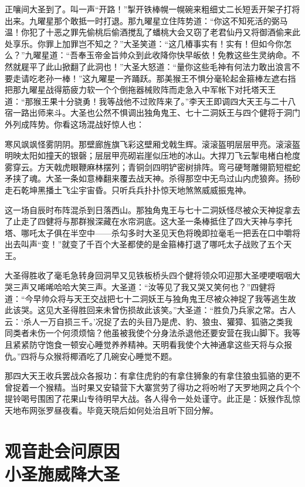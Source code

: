 \documentclass[12pt,UTF8]{ctexbook}
\begin{document}
{正嚷间大圣到了。叫一声“开路！”掣开铁棒幌一幌碗来粗细丈二长短丢开架子打将出来。九曜星那个敢抵一时打退。那九曜星立住阵势道：“你这不知死活的弼马温！你犯了十恶之罪先偷桃后偷酒搅乱了蟠桃大会又窃了老君仙丹又将御酒偷来此处享乐。你罪上加罪岂不知之？”大圣笑道：“这几椿事实有！实有！但如今你怎么？”九曜星道：“吾奉玉帝金旨帅众到此收降你快早皈依！免教这些生灵纳命。不然就屣平了此山掀翻了此洞也！”大圣大怒道：“量你这些毛神有何法力敢出浪言不要走请吃老孙一棒！”这九曜星一齐踊跃。那美猴王不惧分毫轮起金箍棒左遮右挡把那九曜星战得筋疲力软一个个倒拖器械败阵而走急入中军帐下对托塔天王道：“那猴王果十分骁勇！我等战他不过败阵来了。”李天王即调四大天王与二十八宿一路出师来斗。大圣也公然不惧调出独角鬼王、七十二洞妖王与四个健将于洞门外列成阵势。你看这场混战好惊人也：

寒风飒飒怪雾阴阴。那壁廊旌旗飞彩这壁厢戈戟生辉。滚滚盔明层层甲亮。滚滚盔明映太阳如撞天的银磬；层层甲亮砌岩崖似压地的冰山。大捍刀飞云掣电楮白枪度雾穿云。方天戟虎眼鞭麻林摆列；青铜剑四明铲密树排阵。弯弓硬弩雕翎箭短棍蛇矛挟了魂。大圣一条如意棒翻来覆去战天神。杀得那空中无鸟过山内虎狼奔。扬砂走石乾坤黑播土飞尘宇宙昏。只听兵兵扑扑惊天地煞煞威威振鬼神。

这一场自辰时布阵混杀到日落西山。那独角鬼王与七十二洞妖怪尽被众天神捉拿去了止走了四健将与那群猴深藏在水帘洞底。这大圣一条棒抵住了四大天神与李托塔、哪吒太子俱在半空中——杀勾多时大圣见天色将晚即拉毫毛一把丢在口中嚼将出去叫声“变！”就变了千百个大圣都使的是金箍棒打退了哪吒太子战败了五个天王。

大圣得胜收了毫毛急转身回洞早又见铁板桥头四个健将领众叩迎那大圣哽哽咽咽大哭三声又唏唏哈哈大笑三声。大圣道：“汝等见了我又哭又笑何也？”四健将道：“今早帅众将与天王交战把七十二洞妖王与独角鬼王尽被众神捉了我等逃生故此该哭。这见大圣得胜回来未曾伤损故此该笑。”大圣道：“胜负乃兵家之常。古人云：‘杀人一万自损三千。’况捉了去的头目乃是虎、豹、狼虫、獾獐、狐骆之类我同类者未伤一个何须烦恼？他虽被我使个分身法杀退他还要安营在我山脚下。我等且紧紧防守饱食一顿安心睡觉养养精神。天明看我使个大神通拿这些天将与众报仇。”四将与众猴将椰酒吃了几碗安心睡觉不题。

那四大天王收兵罢战众各报功：有拿住虎豹的有拿住狮象的有拿住狼虫狐骆的更不曾捉着一个猴精。当时果又安辕营下大寨赏劳了得功之将吩咐了天罗地网之兵个个提铃喝号围困了花果山专待明早大战。各人得令一处处谨守。此正是：妖猴作乱惊天地布网张罗昼夜看。毕竟天晓后如何处治且听下回分解。

\chapter[观音赴会问原因\ 小圣施威降大圣]{观音赴会问原因\\小圣施威降大圣}

}
\end{document}
